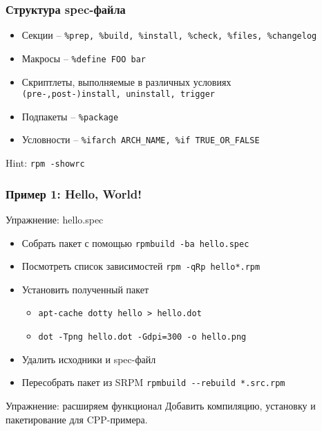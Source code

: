 \begin{frame}
	\frametitle{Структура spec-файла}

	\begin{itemize}
		\item Секции --  {\tt \%prep, \%build, \%install, \%check, \%files, \%changelog} 
		\item Макросы -- {\tt \%define FOO bar} 
		\item Скриптлеты, выполняемые в различных условиях\\
			{\tt (pre-,post-)install, uninstall, trigger}
		\item Подпакеты -- {\tt \%package}
		\item Условности -- {\tt \%ifarch ARCH\_NAME, \%if TRUE\_OR\_FALSE}
	\end{itemize}
	\begin{block}{Hint:}
		 {\tt rpm -\-showrc }
	\end{block}
\end{frame}

\begin{frame}
	\frametitle{Пример 1: Hello, World!}

	\begin{block}{Упражнение: hello.spec}
		\begin{itemize}
			\item Собрать пакет с помощью {\tt rpmbuild -ba hello.spec}
			\item Посмотреть список зависимостей {\tt rpm -qRp hello*.rpm}
			\item Установить полученный пакет
			\begin{itemize}
				\item {\tt apt-cache dotty hello > hello.dot}
				\item {\tt dot -Tpng hello.dot -Gdpi=300 -o hello.png}
			\end{itemize}
			\item Удалить исходники и spec-файл
			\item Пересобрать пакет из SRPM {\tt rpmbuild -{}-rebuild *.src.rpm}
		\end{itemize}
	\end{block}

	\pause

	\begin{block}{Упражнение: расширяем функционал}
		Добавить компиляцию, установку и пакетирование для CPP-примера.
	\end{block}

\end{frame}


